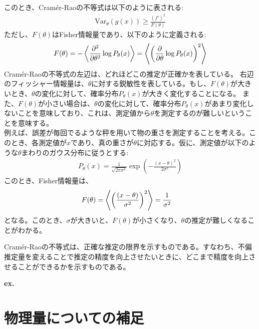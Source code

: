 \documentclass[a4paper,11pt]{jsarticle}
\numberwithin{equation}{section}
\begin{document}
このとき、Cram\'er-Raoの不等式は以下のように表される:
\begin{align}
    \text{Var}_{\theta}(g(x)) \geq \frac{(f')^2}{F(\theta)}
\end{align}
ただし、$F(\theta)$はFisher情報量であり、以下のように定義される:
\begin{align}
    F(\theta) = -\ev{\pdv[2]{\theta} \log P_{\theta}(x)} =\ev{\qty(\pdv{\theta} \log P_{\theta}(x))^2}
\end{align}
Cram\'er-Raoの不等式の左辺は、どれほどこの推定が正確かを表している。
右辺のフィッシャー情報量は、$\theta$に対する鋭敏性を表している。もし、$F(\theta)$が大きいとき、$\theta$の変化に対して、確率分布$P_{\theta}(x)$が大きく変化することになる。
また、$F(\theta)$が小さい場合は、$\theta$の変化に対して、確率分布$P_{\theta}(x)$があまり変化しないことを意味しており、これは、測定値から$\theta$を測定するのが難しいということを意味する。\\


例えば、誤差が毎回でるような秤を用いて物の重さを測定することを考える。このとき、各測定値が$x$であり、真の重さが$\theta$に対応する。仮に、測定値が以下のような$\theta$まわりのガウス分布に従うとする:
\begin{align}
    P_{\theta}(x) = \frac{1}{\sqrt{2\pi \sigma^2}}\exp(-\frac{(x-\theta)^2}{2\sigma^2})
\end{align}
このとき、Fisher情報量は、
\begin{align}
    F(\theta) &= \ev{\qty(\frac{(x-\theta)}{\sigma^2})^2} = \frac{1}{\sigma^2}
\end{align}
となる。このとき、$\sigma$が大きいと、$F(\theta)$が小さくなり、$\theta$の推定が難しくなることがわかる。

Cram\'er-Raoの不等式は、正確な推定の限界を示すものである。すなわち、不偏推定量を変えることで推定の精度を向上させたいときに、どこまで精度を向上させることができるかを示すものである。

\textbf{ex.}\\


\section{物理量についての補足}
\end{document}
